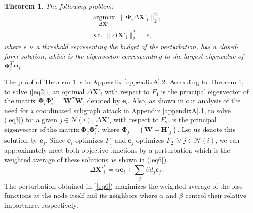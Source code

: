 \documentclass[conference,compsoc]{IEEEtran}
\newtheorem{thm}{Theorem}
\begin{document}
\begin{thm}
\label{theorem2}
The following problem:
\begin{equation}\label{eq7}
\begin{gathered}
\underset{\Delta \boldsymbol{\boldsymbol{X'}_i}}{\operatorname{argmax}}~\|\boldsymbol{\Phi}_i \Delta\boldsymbol{ \boldsymbol{X'}_i}\|_2^2, \\
\text { s.t. } \|\Delta \boldsymbol{ \boldsymbol{X'}_i}\|_2^2=\epsilon,
\end{gathered}
\end{equation}
\noindent where $\epsilon$ is a threshold representing the budget of the perturbation, has a closed-form solution, which is the eigenvector corresponding to the largest eigenvalue of $\boldsymbol{\Phi}_i^T \boldsymbol{\Phi}_i$.
\end{thm}
\par The proof of Theorem \ref{theorem2} is in Appendix \ref{appendixA}.2. According to Theorem \ref{theorem2}, to solve (\ref{eq2}), an optimal $\Delta \boldsymbol{X'}_i$ with respect to $F_1$ is the principal eigenvector of the matrix $\boldsymbol{\Phi}_i \boldsymbol{\Phi}_i^T =\boldsymbol{W}^T \boldsymbol{W}$, denoted by $\boldsymbol{e}_i$. Also, as shown in our analysis of the need for a coordinated subgraph attack in Appendix \ref{appendixA}.1, to solve (\ref{eq3}) for a given $j \in \mathcal{N}(i)$, $\Delta \boldsymbol{X'}_i$ with respect to $F_2$, is the principal eigenvector of the matrix $
\boldsymbol{\Phi}_j \boldsymbol{\Phi}^T_j$, where $\boldsymbol{\Phi}_j=(\boldsymbol{W}-\boldsymbol{H'}_j)$. Let us denote this solution by $\boldsymbol{e}_j$. Since $\boldsymbol{e}_i$ optimizes $F_1$ and $\boldsymbol{e}_j$ optimizes $F_2$ $~\forall~j \in \mathcal{N}(i)$, we can approximately meet both objective functions by a perturbation which is the weighted average of these solutions as shown in (\ref{eq6}).
\begin{equation}\label{eq6}
\Delta \boldsymbol{X'}_i^*=\alpha\boldsymbol{e}_i+\sum_j \beta d_j \boldsymbol{e}_j.
\end{equation}
\noindent The perturbation obtained in (\ref{eq6}) maximizes the weighted average of the loss functions at the node itself and its neighbors where $\alpha$ and $\beta$ control their relative importance, respectively.

\end{document}
